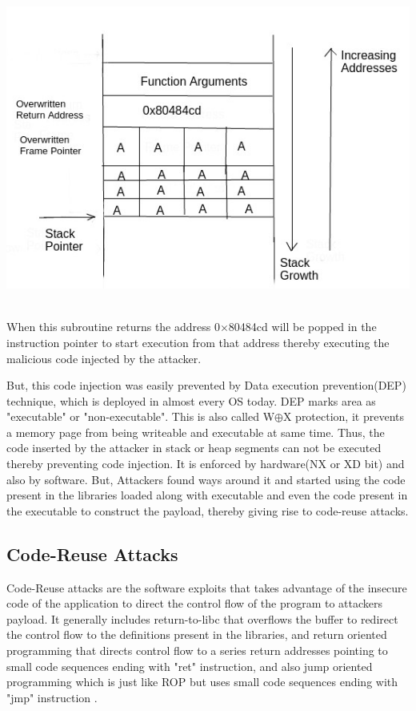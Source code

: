 \documentclass{article}
\begin{document}
\begin{multicols}{2}
	\includegraphics[scale=.45]{stack_prog.jpg}
	\
	
	When this subroutine returns the address 0$\times$80484cd will be popped in the instruction pointer to start execution from that address thereby executing the malicious code injected by the attacker\cite{aleph}.
	
	But, this code injection was easily prevented by Data execution prevention(DEP) technique, which is deployed in almost every OS today. DEP marks area as "executable" or "non-executable". This is also called W$\oplus$X protection, it prevents a memory page from being writeable and executable at same time. Thus, the code inserted by the attacker in stack or heap segments can not be executed thereby preventing code injection. It is enforced by hardware(NX or XD bit) and also by software. But, Attackers found ways around it and started using the code present in the libraries loaded along with executable and even the code present in the executable to construct the payload, thereby giving rise to code-reuse attacks.
	
	\subsection{Code-Reuse Attacks}
	Code-Reuse attacks are the software exploits that takes advantage of the insecure code of the application to direct the control flow of the program to attackers payload. It generally includes return-to-libc that overflows the buffer to redirect the control flow to the definitions present in the libraries, and return oriented programming that directs control flow to a series return addresses pointing to small code sequences ending with "ret" instruction, and also jump oriented programming which is just like ROP but uses small code sequences ending with "jmp" instruction \cite{jop}.
	

\end{multicols}
\end{document}
